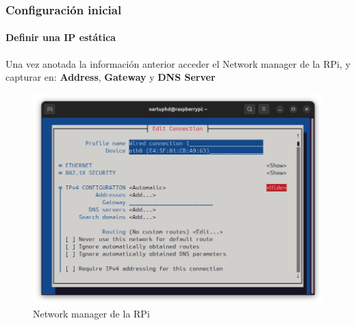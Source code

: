 \documentclass{beamer}
\begin{document}
	\begin{frame}
		\frametitle{Configuración inicial}
		\framesubtitle{Definir una IP estática}
		Una vez anotada la información anterior acceder el Network manager de la RPi, y capturar en: \textbf{Address}, \textbf{Gateway} y \textbf{DNS Server}
		\begin{figure}
			\includegraphics[scale=0.25]{rpissh4.png}
			\caption{Network manager de la RPi}
		\end{figure}
	\end{frame}
\end{document}

